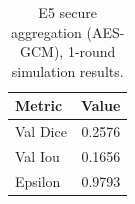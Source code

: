 \begin{table}[t]
\centering
\begin{tabular}{lr}
\toprule
Metric & Value \\
\midrule
Val Dice & 0.2576 \\
Val Iou & 0.1656 \\
Epsilon & 0.9793 \\
\bottomrule
\end{tabular}
\caption{E5 secure aggregation (AES-GCM), 1-round simulation results.}
\label{tab:e5-secagg}
\end{table}